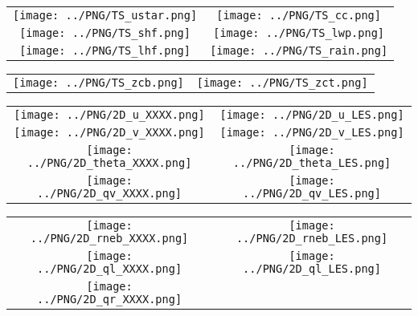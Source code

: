 \documentclass{article}
\begin{document}

\begin{table}
  \begin{tabular}{cc}
    \texttt{[image: ../PNG/TS\_ustar.png]} & \texttt{[image: ../PNG/TS\_cc.png]}   \\ 
    \texttt{[image: ../PNG/TS\_shf.png]}   & \texttt{[image: ../PNG/TS\_lwp.png]}  \\
    \texttt{[image: ../PNG/TS\_lhf.png]}   & \texttt{[image: ../PNG/TS\_rain.png]}
  \end{tabular}
\end{table}

\newpage

\begin{table}
  \begin{tabular}{cc}
    \texttt{[image: ../PNG/TS\_zcb.png]} &  \texttt{[image: ../PNG/TS\_zct.png]}
  \end{tabular}
\end{table}

\newpage

\begin{table}
  \begin{tabular}{cc}
     \texttt{[image: ../PNG/2D\_u\_XXXX.png]}     & \texttt{[image: ../PNG/2D\_u\_LES.png]}     \\
     \texttt{[image: ../PNG/2D\_v\_XXXX.png]}     & \texttt{[image: ../PNG/2D\_v\_LES.png]}     \\
     \texttt{[image: ../PNG/2D\_theta\_XXXX.png]} & \texttt{[image: ../PNG/2D\_theta\_LES.png]} \\
     \texttt{[image: ../PNG/2D\_qv\_XXXX.png]}    & \texttt{[image: ../PNG/2D\_qv\_LES.png]}
  \end{tabular}
\end{table}

\newpage

\begin{table}
  \begin{tabular}{cc}
     \texttt{[image: ../PNG/2D\_rneb\_XXXX.png]} & \texttt{[image: ../PNG/2D\_rneb\_LES.png]} \\
     \texttt{[image: ../PNG/2D\_ql\_XXXX.png]}   & \texttt{[image: ../PNG/2D\_ql\_LES.png]}   \\
     \texttt{[image: ../PNG/2D\_qr\_XXXX.png]}   & %
  \end{tabular}
\end{table}
\end{document}
